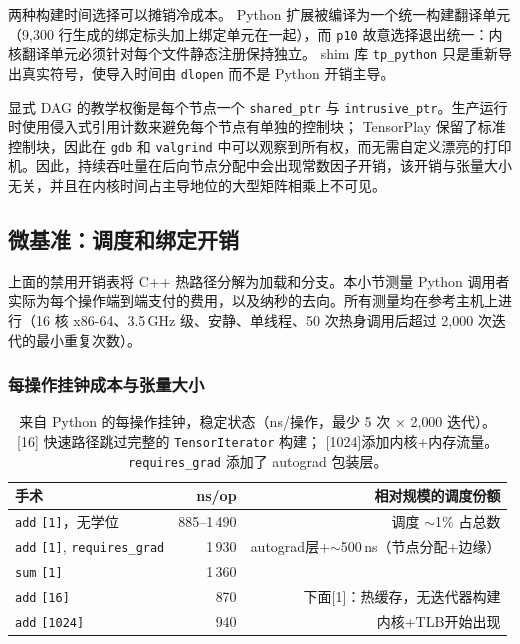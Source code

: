 两种构建时间选择可以摊销冷成本。 Python 扩展被编译为一个统一构建翻译单元（9{,}300 行生成的绑定标头加上绑定单元在一起），而 \texttt{p10} 故意选择退出统一：内核翻译单元必须针对每个文件静态注册保持独立。 shim 库 \texttt{tp\_python} 只是重新导出真实符号，使导入时间由 \texttt{dlopen} 而不是 Python 开销主导。

显式 DAG 的教学权衡是每个节点一个 \texttt{shared\_ptr} 与 \texttt{intrusive\_ptr}。生产运行时使用侵入式引用计数来避免每个节点有单独的控制块； TensorPlay 保留了标准控制块，因此在 \texttt{gdb} 和 \texttt{valgrind} 中可以观察到所有权，而无需自定义漂亮的打印机。因此，持续吞吐量在后向节点分配中会出现常数因子开销，该开销与张量大小无关，并且在内核时间占主导地位的大型矩阵相乘上不可见。

\subsection{微基准：调度和绑定开销}
\label{subsec:eval-microbench}

上面的禁用开销表将 C++ 热路径分解为加载和分支。本小节测量 Python 调用者实际为每个操作端到端支付的费用，以及纳秒的去向。所有测量均在参考主机上进行（16 核 x86-64、3.5\,GHz 级、安静、单线程、50 次热身调用后超过 2{,}000 次迭代的最小重复次数）。

\subsubsection{每操作挂钟成本与张量大小}

\begin{table}[H]
\centering
\caption{来自 Python 的每操作挂钟，稳定状态（ns/操作，最少 5 次 $\times$ 2{,}000 迭代）。 [16] 快速路径跳过完整的 \texttt{TensorIterator} 构建； [1024]添加内核+内存流量。 \texttt{requires\_grad} 添加了 autograd 包装层。}
\label{tab:microbench-perop}
\small
\begin{tabular}{lrr}
\toprule
手术 & ns/op & 相对规模的调度份额 \\
\midrule
\texttt{add} \texttt{[1]}，无学位 & 885--1\,490 & 调度 $\sim$1\% 占总数 \\
\texttt{add} \texttt{[1]}, \texttt{requires\_grad} & 1\,930 & autograd层+$\sim$500\,ns（节点分配+边缘） \\
\texttt{sum} \texttt{[1]} & 1\,360 & \\
\texttt{add} \texttt{[16]} & 870 & 下面[1]：热缓存，无迭代器构建 \\
\texttt{add} \texttt{[1024]} & 940 & 内核+TLB开始出现 \\
\bottomrule
\end{tabular}
\end{table}

